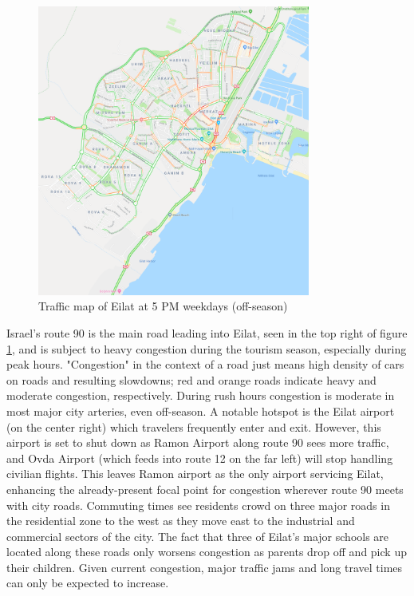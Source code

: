 \documentclass[12pt]{article}                               %
\begin{document}
\begin{figure}[H]
    \centering
    \includegraphics[width=0.8\textwidth]{images/eilat_traffic.png}
    \caption{Traffic map of Eilat at 5 PM weekdays (off-season)}
    \label{img:eilatTraffic}
\end{figure}

Israel's route 90 is the main road leading into Eilat, seen in the top right of figure \ref{img:eilatTraffic}, and is subject to heavy congestion during the tourism season, especially during peak hours. "Congestion" in the context of a road just means high density of cars on roads and resulting slowdowns; red and orange roads indicate heavy and moderate congestion, respectively. During rush hours congestion is moderate in most major city arteries, even off-season. A notable hotspot is the Eilat airport (on the center right) which travelers frequently enter and exit. However, this airport is set to shut down as Ramon Airport along route 90 sees more traffic, and Ovda Airport (which feeds into route 12 on the far left) will stop handling civilian flights. This leaves Ramon airport as the only airport servicing Eilat, enhancing the already-present focal point for congestion wherever route 90 meets with city roads. Commuting times see residents crowd on three major roads in the residential zone to the west as they move east to the industrial and commercial sectors of the city. The fact that three of Eilat's major schools are located along these roads only worsens congestion as parents drop off and pick up their children. Given current congestion, major traffic jams and long travel times can only be expected to increase.
\end{document}
